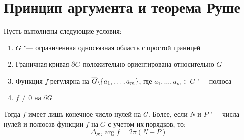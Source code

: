 \section{Принцип аргумента и теорема Руше}

\begin{theorem}
	Пусть выполнены следующие условия:
	\begin{enumerate}
		\item $G$ "--- ограниченная односвязная область с простой границей
		
		\item Граничная кривая $\partial G$ положительно ориентирована относительно $G$
		
		\item Функция $f$ регулярна на $\overline{G} \backslash \{a_1, \dotsc, a_m\}$, где $a_1, \dotsc, a_m \in G$ "--- полюса
		
		\item $f \ne 0$ на $\partial G$
	\end{enumerate}
	
	Тогда $f$ имеет лишь конечное число нулей на $G$. Более, если $N$ и $P$ "--- числа нулей и полюсов функции $f$ на $G$ с учетом их порядков, то:
	\[\Delta_{\partial G} \arg f = 2\pi (N - P)\]
\end{theorem}

